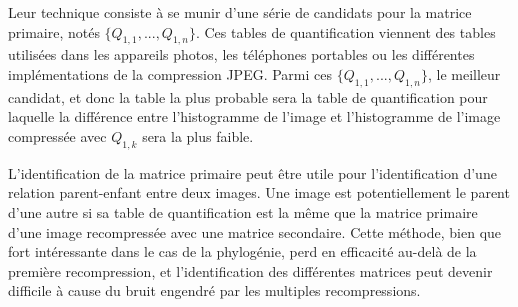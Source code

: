 \documentclass[utf8,final]{stageM2R} %
\begin{document}
Leur technique consiste à se munir d'une série de candidats pour la matrice primaire, notés $\{Q_{1,1},...,Q_{1,n}\}$. Ces tables de quantification viennent des tables utilisées dans les appareils photos, les téléphones portables ou les différentes implémentations de la compression JPEG. Parmi ces $\{Q_{1,1},...,Q_{1,n}\}$, le meilleur candidat, et donc la table la plus probable sera la table de quantification pour laquelle la différence entre l'histogramme de l'image et l'histogramme de l'image compressée avec $Q_{1,k}$ sera la plus faible.

L'identification de la matrice primaire peut être utile pour l'identification d'une relation parent-enfant entre deux images. Une image est potentiellement le parent d'une autre si sa table de quantification est la même que la matrice primaire d'une image recompressée avec une matrice secondaire. Cette méthode, bien que fort intéressante dans le cas de la phylogénie, perd en efficacité au-delà de la première recompression, et l'identification des différentes matrices peut devenir difficile à cause du bruit engendré par les multiples recompressions. 
\end{document}
